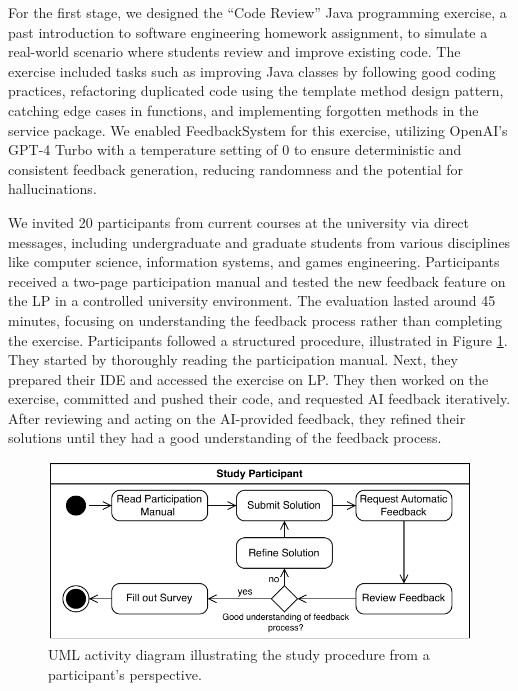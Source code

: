 \documentclass[sigconf,screen,review,anonymous]{acmart}
\begin{document}
For the first stage, we designed the ``Code Review'' Java programming exercise, a past introduction to software engineering homework assignment, to simulate a real-world scenario where students review and improve existing code.
The exercise included tasks such as improving Java classes by following good coding practices, refactoring duplicated code using the template method design pattern, catching edge cases in functions, and implementing forgotten methods in the service package.
We enabled FeedbackSystem for this exercise, utilizing OpenAI's GPT-4 Turbo with a temperature setting of 0 to ensure deterministic and consistent feedback generation, reducing randomness and the potential for hallucinations.

We invited 20 participants from current courses at the university via direct messages, including undergraduate and graduate students from various disciplines like computer science, information systems, and games engineering. 
Participants received a two-page participation manual and tested the new feedback feature on the LP in a controlled university environment. 
The evaluation lasted around 45 minutes, focusing on understanding the feedback process rather than completing the exercise.
Participants followed a structured procedure, illustrated in Figure \ref{fig:Study-Design}.
They started by thoroughly reading the participation manual.
Next, they prepared their IDE and accessed the exercise on LP.
They then worked on the exercise, committed and pushed their code, and requested AI feedback iteratively.
After reviewing and acting on the AI-provided feedback, they refined their solutions until they had a good understanding of the feedback process.

\begin{figure}[htbp]
  \vspace{-3mm}
  \centering
  \includegraphics[width=\linewidth]{figures/Study-Design.pdf}
  \vspace{-5mm}
  \caption{UML activity diagram illustrating the study procedure from a participant's perspective.}
  \label{fig:Study-Design}
  \vspace{-3mm}
\end{figure}
\end{document}
